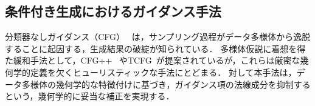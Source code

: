 \documentclass[MIRU,submit]{miru2026j}
\theoremstyle{definition}
\begin{document}
\subsection{条件付き生成におけるガイダンス手法}
分類器なしガイダンス（CFG）~\cite{Ho2021} は，サンプリング過程がデータ多様体から逸脱することに起因する，生成結果の破綻が知られている．
多様体仮説に着想を得た緩和手法として，CFG++~\cite{Chung2025} やTCFG~\cite{Kwon2025}が提案されているが，これらは厳密な幾何学的定義を欠くヒューリスティックな手法にとどまる．
対して本手法は，データ多様体の幾何学的な特徴付けに基づき，ガイダンス項の法線成分を抑制するという，幾何学的に妥当な補正を実現する．

\end{document}
